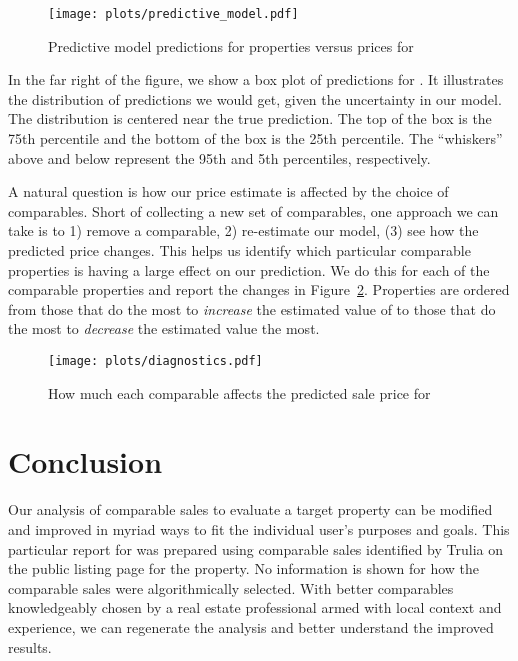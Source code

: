 \documentclass[
12pt, %
letterpaper, %
oneside, %
headinclude,footinclude, %
BCOR5mm, %
]{scrartcl}
\begin{document}
\begin{figure}
\centering
\caption{Predictive model predictions for properties versus prices for \PropertyName{}} \label{fig:predictive_model}  
\texttt{[image: plots/predictive\_model.pdf]} 
\end{figure}

In the far right of the figure, we show a box plot of predictions for \PropertyName{}.
It illustrates the distribution of predictions we would get, given the uncertainty in our model. 
The distribution is centered near the true prediction.
The top of the box is the 75th percentile and the bottom of the box is the 25th percentile.
The ``whiskers'' above and below represent the 95th and 5th percentiles, respectively. 


A natural question is how our price estimate is affected by the choice of comparables.
Short of collecting a new set of comparables, one approach we can take is to 1) remove a comparable, 2) re-estimate our model, (3) see how the predicted price changes.
This helps us identify which particular comparable properties is having a large effect on our prediction.
We do this for each of the comparable properties and report the changes in Figure~\ref{fig:diagnostics}.
Properties are ordered from those that do the most to \emph{increase} the estimated value of \PropertyName{} to those that do the most to \emph{decrease} the estimated value the most.

\begin{figure}
\centering
\caption{How much each comparable affects the predicted sale price for \PropertyName{}} \label{fig:diagnostics}  
\texttt{[image: plots/diagnostics.pdf]} 
\end{figure}

\section{Conclusion}
Our analysis of comparable sales to evaluate a target property can be modified and improved in myriad ways to fit the individual user's purposes and goals.
This particular report for \PropertyName{} was prepared using comparable sales identified by Trulia on the public listing page for the property. 
No information is shown for how the comparable sales were algorithmically selected.
With better comparables knowledgeably chosen by a real estate professional armed with local context and experience, we can regenerate the analysis and better understand the improved results.
\end{document}
